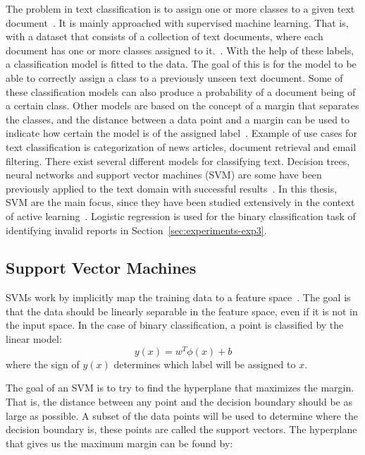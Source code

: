 The problem in text classification is to assign one or more classes to a given text document~\cite{aggarwal2012surveyclass}.
It is mainly approached with supervised machine learning.
That is, with a dataset that consists of a collection of text documents, where each document has one or more classes assigned to it.~\cite{bishop2006pattern}.
With the help of these labels, a classification model is fitted to the data.
The goal of this is for the model to be able to correctly assign a class to a previously unseen text document.
Some of these classification models can also produce a probability of a document being of a certain class.
Other models are based on the concept of a margin that separates the classes, and the distance between a data point and a margin can be used to indicate how certain the model is of the assigned label~\cite{tong2001support}.
Example of use cases for text classification is categorization of news articles, document retrieval and email filtering.
There exist several different models for classifying text.
Decision trees, neural networks and support vector machines (SVM) are some have been previously applied to the text domain with successful results~\cite{aggarwal2012survey}.
In this thesis, SVM are the main focus, since they have been studied extensively in the context of active learning~\cite{tong2001support, settles2012active, brinker2006active, yang2009effective}.
Logistic regression is used for the binary classification task of identifying invalid reports in Section~\ref{sec:experiments-exp3}.

\subsection{Support Vector Machines}

SVMs work by implicitly map the training data to a feature space~\cite{bishop2006pattern}.
The goal is that the data should be linearly separable in the feature space, even if it is not in the input space.
In the case of binary classification, a point is classified by the linear model:
\begin{equation}\label{eq:svm-y}
    y(x) = w^T \phi(x) + b
\end{equation}
where the sign of $y(x)$ determines which label will be assigned to $x$.

The goal of an SVM is to try to find the hyperplane that maximizes the margin.
That is, the distance between any point and the decision boundary should be as large as possible.
A subset of the data points will be used to determine where the decision boundary is, these points are called the support vectors.
The hyperplane that gives us the maximum margin can be found by:

